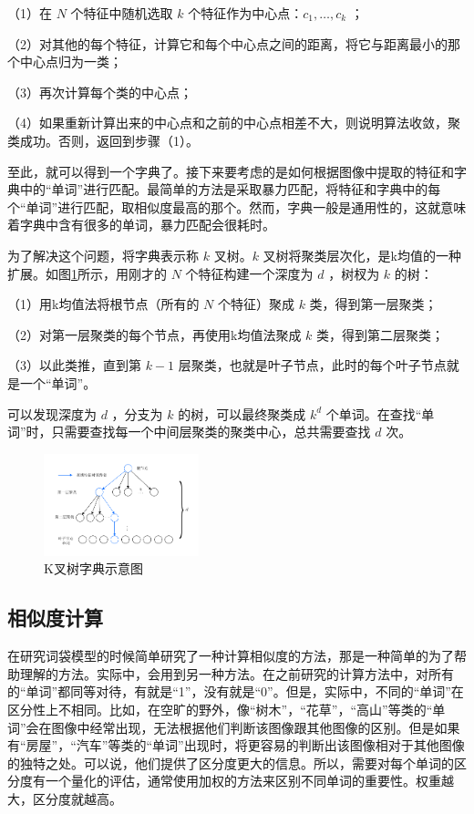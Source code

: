 （1）在 $N$ 个特征中随机选取 $k$ 个特征作为中心点：$c_{1}, \dots, c_{k} $ ；

（2）对其他的每个特征，计算它和每个中心点之间的距离，将它与距离最小的那个中心点归为一类；

（3）再次计算每个类的中心点；

（4）如果重新计算出来的中心点和之前的中心点相差不大，则说明算法收敛，聚类成功。否则，返回到步骤（1）。

至此，就可以得到一个字典了。接下来要考虑的是如何根据图像中提取的特征和字典中的“单词”进行匹配。最简单的方法是采取暴力匹配，将特征和字典中的每个“单词”进行匹配，取相似度最高的那个。然而，字典一般是通用性的，这就意味着字典中含有很多的单词，暴力匹配会很耗时。

为了解决这个问题，将字典表示称 $k$ 叉树。$k$ 叉树将聚类层次化，是k均值的一种扩展。如图\ref{fig4_7}所示，用刚才的 $N$ 个特征构建一个深度为 $d$ ，树杈为 $k$ 的树：

（1）用k均值法将根节点（所有的 $N$ 个特征）聚成 $k$ 类，得到第一层聚类；

（2）对第一层聚类的每个节点，再使用k均值法聚成 $k$ 类，得到第二层聚类；

（3）以此类推，直到第 $k-1$ 层聚类，也就是叶子节点，此时的每个叶子节点就是一个“单词”。

可以发现深度为 $d$ ，分支为 $k$ 的树，可以最终聚类成 $k^d$ 个单词。在查找“单词”时，只需要查找每一个中间层聚类的聚类中心，总共需要查找 $d$ 次。
\begin{figure}[h]\setlength{\belowcaptionskip}{-12pt}
	\centering
	\includegraphics[width=0.4\textwidth, angle=-90]{figures/chapter4/fig4_7}
	\caption{K叉树字典示意图}\label{fig4_7}
\end{figure}
\subsection{相似度计算}
在研究词袋模型的时候简单研究了一种计算相似度的方法，那是一种简单的为了帮助理解的方法。实际中，会用到另一种方法。在之前研究的计算方法中，对所有的“单词”都同等对待，有就是“1”，没有就是“0”。但是，实际中，不同的“单词”在区分性上不相同。比如，在空旷的野外，像“树木”，“花草”，“高山”等类的“单词”会在图像中经常出现，无法根据他们判断该图像跟其他图像的区别。但是如果有“房屋”，“汽车”等类的“单词”出现时，将更容易的判断出该图像相对于其他图像的独特之处。可以说，他们提供了区分度更大的信息。所以，需要对每个单词的区分度有一个量化的评估，通常使用加权的方法来区别不同单词的重要性。权重越大，区分度就越高。


